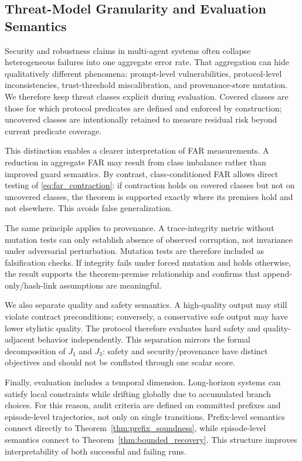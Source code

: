 \documentclass{article} %
\begin{document}
\subsection{Threat-Model Granularity and Evaluation Semantics}
Security and robustness claims in multi-agent systems often collapse heterogeneous failures into one aggregate error rate. That aggregation can hide qualitatively different phenomena: prompt-level vulnerabilities, protocol-level inconsistencies, trust-threshold miscalibration, and provenance-store mutation. We therefore keep threat classes explicit during evaluation. Covered classes are those for which protocol predicates are defined and enforced by construction; uncovered classes are intentionally retained to measure residual risk beyond current predicate coverage.

This distinction enables a clearer interpretation of FAR measurements. A reduction in aggregate FAR may result from class imbalance rather than improved guard semantics. By contrast, class-conditioned FAR allows direct testing of \eqref{eq:far_contraction}: if contraction holds on covered classes but not on uncovered classes, the theorem is supported exactly where its premises hold and not elsewhere. This avoids false generalization.

The same principle applies to provenance. A trace-integrity metric without mutation tests can only establish absence of observed corruption, not invariance under adversarial perturbation. Mutation tests are therefore included as falsification checks. If integrity fails under forced mutation and holds otherwise, the result supports the theorem-premise relationship and confirms that append-only/hash-link assumptions are meaningful.

We also separate quality and safety semantics. A high-quality output may still violate contract preconditions; conversely, a conservative safe output may have lower stylistic quality. The protocol therefore evaluates hard safety and quality-adjacent behavior independently. This separation mirrors the formal decomposition of $J_1$ and $J_3$: safety and security/provenance have distinct objectives and should not be conflated through one scalar score.

Finally, evaluation includes a temporal dimension. Long-horizon systems can satisfy local constraints while drifting globally due to accumulated branch choices. For this reason, audit criteria are defined on committed prefixes and episode-level trajectories, not only on single transitions. Prefix-level semantics connect directly to Theorem~\ref{thm:prefix_soundness}, while episode-level semantics connect to Theorem~\ref{thm:bounded_recovery}. This structure improves interpretability of both successful and failing runs.
\end{document}

